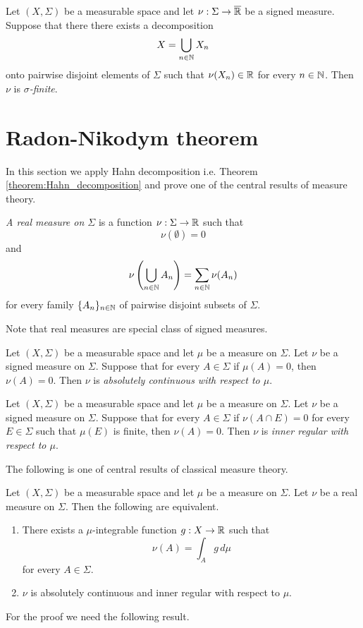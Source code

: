 \begin{definition}
    Let $(X,\Sigma)$ be a measurable space and let $\nu:\Sigma \rightarrow \overline{{\mathbb R}}$ be a signed measure. Suppose that there there exists a decomposition
    $$X = \bigcup_{n\in {\mathbb N}}X_n$$
    onto pairwise disjoint elements of $\Sigma$ such that $\nu(X_n) \in {\mathbb R}$ for every $n\in {\mathbb N}$. Then $\nu$ is \textit{$\sigma$-finite}.
\end{definition}

\section{Radon-Nikodym theorem}
\noindent
In this section we apply Hahn decomposition i.e. Theorem \ref{theorem:Hahn_decomposition} and prove one of the central results of measure theory.

\begin{definition}
    \textit{A real measure on $\Sigma$} is a function $\nu:\Sigma\rightarrow {\mathbb R}$ such that $$\nu(\emptyset)=0$$
    and
    $$\nu\left(\bigcup_{n\in {\mathbb N}}A_n\right)=\sum_{n\in {\mathbb N}}\nu(A_n)$$
    for every family $\{A_n\}_{n\in {\mathbb N}}$ of pairwise disjoint subsets of $\Sigma$.
\end{definition}
\noindent
Note that real measures are special class of signed measures.

\begin{definition}
    Let $(X,\Sigma)$ be a measurable space and let $\mu$ be a measure on $\Sigma$. Let $\nu$ be a signed measure on $\Sigma$. Suppose that for every $A \in \Sigma$ if $\mu(A) = 0$, then $\nu(A) = 0$. Then $\nu$ is \textit{absolutely continuous with respect to $\mu$}.
\end{definition}

\begin{definition}
    Let $(X,\Sigma)$ be a measurable space and let $\mu$ be a measure on $\Sigma$. Let $\nu$ be a signed measure on $\Sigma$. Suppose that for every $A \in \Sigma$ if $\nu(A\cap E) = 0$ for every $E \in \Sigma$ such that $\mu(E)$ is finite, then $\nu(A) = 0$. Then $\nu$ is \textit{inner regular with respect to $\mu$}.
\end{definition}
\noindent
The following is one of central results of classical measure theory.

\begin{theorem}\label{theorem:general_Radon_Nikodym}
    Let $(X,\Sigma)$ be a measurable space and let $\mu$ be a measure on $\Sigma$. Let $\nu$ be a real measure on $\Sigma$. Then the following are equivalent.
    \begin{enumerate}[label=\emph{\textbf{(\roman*)}}, leftmargin=3.0em]
        \item There exists a $\mu$-integrable function $g:X\rightarrow {\mathbb R}$ such that
              $$\nu(A) = \int_Ag\,d\mu$$
              for every $A \in \Sigma$.
        \item $\nu$ is absolutely continuous and inner regular with respect to $\mu$.
    \end{enumerate}
\end{theorem}
\noindent
For the proof we need the following result.

